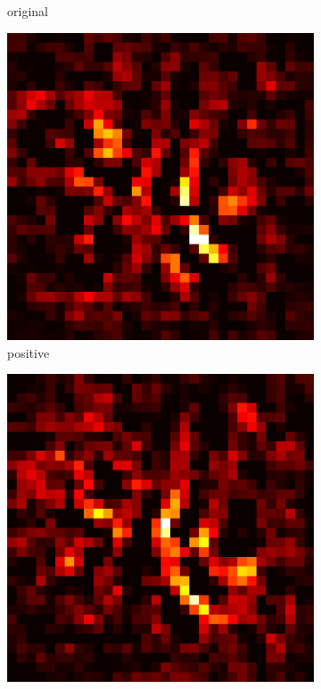 \documentclass[preprint,12pt]{elsarticle}
\begin{document}
\begin{figure}
\begin{subfigure}{0.14\linewidth}
        \caption{original}
    \end{subfigure}
    \hfill
    \begin{subfigure}{0.14\textwidth}
        \centering
        \includegraphics[width=\linewidth]{../visualizations/examples/cifar10/cnn/positive_saliency_map/6.png}
        \caption{positive}
    \end{subfigure}
    \hfill
    \begin{subfigure}{0.14\textwidth}
        \centering
        \includegraphics[width=\linewidth]{../visualizations/examples/cifar10/cnn/negative_saliency_map/6.png}

\end{subfigure}
\end{figure}
\end{document}
